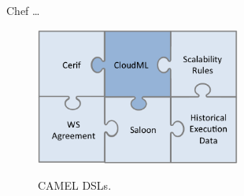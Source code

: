 Chef \ldots


\begin{figure}[h]
	\caption{CAMEL DSLs.}
	\includegraphics[width=0.6\textwidth,natwidth=200,natheight=150]{./fig/dsl.png}
	\centering
	\label{fig:dsls}
\end{figure}



